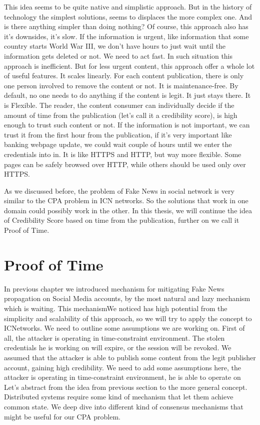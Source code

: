 \documentclass[nostrict]{szablonPG}
\begin{document}
This idea seems to be quite native and simplistic approach. But  in the history of technology the simplest solutions, seems to displaces the more complex one. And is there anything simpler than doing nothing? 
Of course, this approach also has it's downsides, it's slow. If the information is urgent, like information that some country starts World War III, we don't have hours to just wait until the information gets deleted or not. We need to act fast. In such situation this approach is inefficient. But for less urgent content, this approach offer a whole lot of useful features. It scales linearly. For each content publication, there is only one person involved to remove the content or not. It is maintenance-free. By default, no one needs to do anything if the content is legit. It just stays there. It is Flexible. The reader, the content consumer can individually decide if the amount of time from the publication (let's call it a credibility score), is high enough to trust such content or not. If the information is not important, we can trust it from the first hour from the publication, if it's very important like banking webpage update, we could wait couple of hours until we enter the credentials into in. It is like HTTPS and HTTP, but way more flexible. Some pages can be safely browsed over HTTP, while others should be used only over HTTPS. 

As we discussed before, the problem of Fake News in social network is very similar to the CPA problem in ICN networks. So the solutions that work in one domain could possibly work in the other. In this thesis, we will continue the idea of Credibility Score based on time from the publication, further on we call it Proof of Time.

\section{Proof of Time}
In previous chapter we introduced mechanism for mitigating Fake News propagation on Social Media accounts, by the most natural and lazy mechanism which is waiting. This mechanismWe noticed has high potential from the simplicity and scalability of this approach, so we will try to apply the concept to ICNetworks. We need to outline some assumptions we are working on. First of all, the attacker is operating in time-constraint environment. The stolen credentials he is working on will expire, or the session will be revoked.  We assumed that the attacker is able to publish some content from the legit publisher account, gaining high credibility. We need to add some assumptions here, the attacker is operating in time-constraint environment, he is able to operate on 
Let's abstract from the idea from previous section to the more general concept.
Distributed systems require some kind of mechanism that let them achieve common state. We deep dive into different kind of consensus mechanisms that might be useful for our CPA problem.
\end{document}
